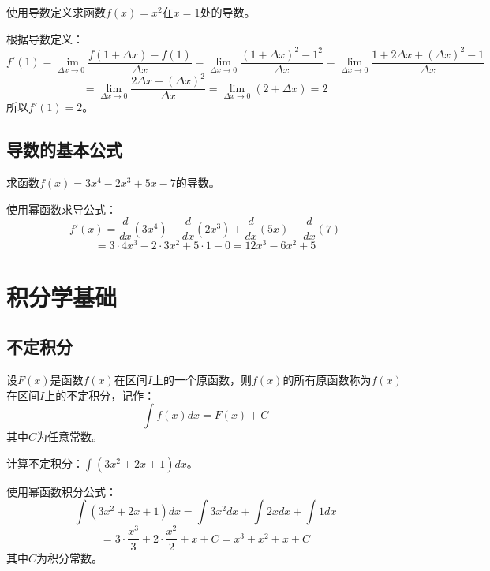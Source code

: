 \documentclass[oneside]{book}
\begin{document}
\begin{example}[使用定义求导]
使用导数定义求函数$f(x)=x^2$在$x=1$处的导数。
\end{example}

\begin{answer}
根据导数定义：
\[
f'(1) = \lim_{\Delta x \to 0} \frac{f(1+\Delta x) - f(1)}{\Delta x}
= \lim_{\Delta x \to 0} \frac{(1+\Delta x)^2 - 1^2}{\Delta x}
= \lim_{\Delta x \to 0} \frac{1 + 2\Delta x + (\Delta x)^2 - 1}{\Delta x}
\]
\[
= \lim_{\Delta x \to 0} \frac{2\Delta x + (\Delta x)^2}{\Delta x}
= \lim_{\Delta x \to 0} (2 + \Delta x) = 2
\]
所以$f'(1)=2$。
\end{answer}

\subsection{导数的基本公式}

\begin{example}[导数计算]
求函数$f(x)=3x^4 - 2x^3 + 5x - 7$的导数。
\end{example}

\begin{answer}
使用幂函数求导公式：
\[
f'(x) = \frac{d}{dx}(3x^4) - \frac{d}{dx}(2x^3) + \frac{d}{dx}(5x) - \frac{d}{dx}(7)
\]
\[
= 3 \cdot 4x^{3} - 2 \cdot 3x^{2} + 5 \cdot 1 - 0
= 12x^3 - 6x^2 + 5
\]
\end{answer}

\newpage
\section{积分学基础}

\subsection{不定积分}

\begin{definition}[不定积分]
设$F(x)$是函数$f(x)$在区间$I$上的一个原函数，则$f(x)$的所有原函数称为$f(x)$在区间$I$上的不定积分，记作：
\[
\int f(x)dx = F(x) + C
\]
其中$C$为任意常数。
\end{definition}

\begin{example}[基本积分计算]
计算不定积分：$\displaystyle \int (3x^2 + 2x + 1)dx$。
\end{example}

\begin{answer}
使用幂函数积分公式：
\[
\int (3x^2 + 2x + 1)dx = \int 3x^2 dx + \int 2x dx + \int 1 dx
\]
\[
= 3 \cdot \frac{x^{3}}{3} + 2 \cdot \frac{x^{2}}{2} + x + C
= x^3 + x^2 + x + C
\]
其中$C$为积分常数。
\end{answer}
\end{document}
